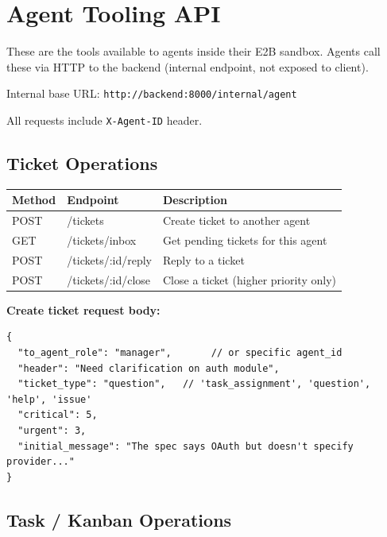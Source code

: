 \documentclass[11pt,a4paper]{article}
\begin{document}
\section{Agent Tooling API}

These are the tools available to agents inside their E2B sandbox. Agents call these via HTTP to the backend (internal endpoint, not exposed to client).

Internal base URL: \texttt{http://backend:8000/internal/agent}

All requests include \texttt{X-Agent-ID} header.

\subsection{Ticket Operations}

\begin{longtable}{p{2.5cm} p{5cm} p{6cm}}
\toprule
\textbf{Method} & \textbf{Endpoint} & \textbf{Description} \\
\midrule
\endhead
POST   & /tickets                   & Create ticket to another agent \\
GET    & /tickets/inbox             & Get pending tickets for this agent \\
POST   & /tickets/:id/reply         & Reply to a ticket \\
POST   & /tickets/:id/close         & Close a ticket (higher priority only) \\
\bottomrule
\end{longtable}

\textbf{Create ticket request body:}
\begin{lstlisting}
{
  "to_agent_role": "manager",       // or specific agent_id
  "header": "Need clarification on auth module",
  "ticket_type": "question",   // 'task_assignment', 'question', 'help', 'issue'
  "critical": 5,
  "urgent": 3,
  "initial_message": "The spec says OAuth but doesn't specify provider..."
}
\end{lstlisting}

\subsection{Task / Kanban Operations}
\end{document}
